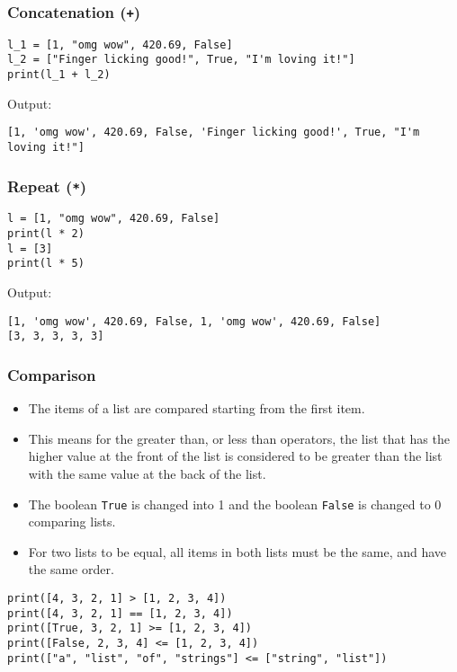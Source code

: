 \documentclass[11pt]{article}
\begin{document}
\subsubsection{Concatenation (\texttt{+})}
\label{sec:org1ef33c9}
\begin{verbatim}
l_1 = [1, "omg wow", 420.69, False]
l_2 = ["Finger licking good!", True, "I'm loving it!"]
print(l_1 + l_2)
\end{verbatim}

 \noindent Output:

\begin{verbatim}
[1, 'omg wow', 420.69, False, 'Finger licking good!', True, "I'm loving it!"]
\end{verbatim}

\subsubsection{Repeat (\texttt{*})}
\label{sec:orgb41f364}
\begin{verbatim}
l = [1, "omg wow", 420.69, False]
print(l * 2)
l = [3]
print(l * 5)
\end{verbatim}

 \noindent Output:

\begin{verbatim}
[1, 'omg wow', 420.69, False, 1, 'omg wow', 420.69, False]
[3, 3, 3, 3, 3]
\end{verbatim}

\subsubsection{Comparison}
\label{sec:org091c20e}
\begin{itemize}
\item The items of a list are compared starting from the first item.
\item This means for the greater than, or less than operators, the list that has the higher value at the front of the list is considered to be greater than the list with the same value at the back of the list.
\item The boolean \texttt{True} is changed into 1 and the boolean \texttt{False} is changed to 0 comparing lists.
\item For two lists to be equal, all items in both lists must be the same, and have the same order.
\end{itemize}
\begin{verbatim}
print([4, 3, 2, 1] > [1, 2, 3, 4])
print([4, 3, 2, 1] == [1, 2, 3, 4])
print([True, 3, 2, 1] >= [1, 2, 3, 4])
print([False, 2, 3, 4] <= [1, 2, 3, 4])
print(["a", "list", "of", "strings"] <= ["string", "list"])
\end{verbatim}
\end{document}
